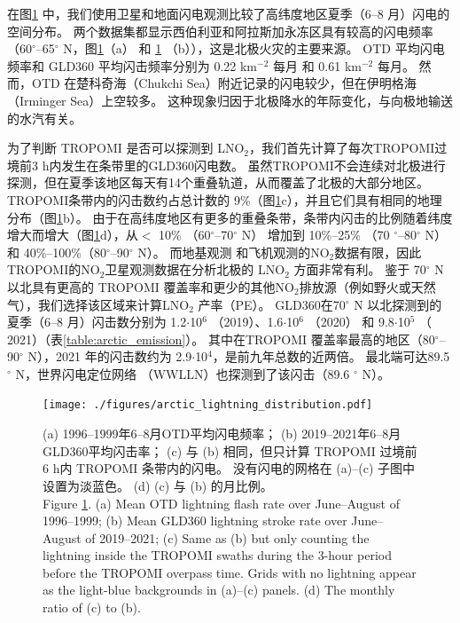 在图\ref{fig:arctic_lightning_distribution} 中，我们使用卫星和地面闪电观测比较了高纬度地区夏季（6--8 月）闪电的空间分布。
两个数据集都显示西伯利亚和阿拉斯加永冻区具有较高的闪电频率（60$^{\circ}$--65$^{\circ}$ N，图\ref{fig:arctic_lightning_distribution}（a） 和 \ref{fig:arctic_lightning_distribution} （b）），这是北极火灾的主要来源\citep{McCarty.2021}。
OTD 平均闪电频率和 GLD360 平均闪击频率分别为 0.22 km$^{-2}$ 每月 和 0.61 km$^{-2}$ 每月。
然而，OTD 在楚科奇海（Chukchi Sea）附近记录的闪电较少，但在伊明格海（Irminger Sea）上空较多。
这种现象归因于北极降水的年际变化，与向极地输送的水汽有关\citep{Bintanja.2020}。

为了判断 TROPOMI 是否可以探测到 LNO$_2$，我们首先计算了每次TROPOMI过境前3 h内发生在条带里的GLD360闪电数。
虽然TROPOMI不会连续对北极进行探测，但在夏季该地区每天有14个重叠轨道，从而覆盖了北极的大部分地区。
TROPOMI条带内的闪击数约占总计数的 9\%（图\ref{fig:arctic_lightning_distribution}c），并且它们具有相同的地理分布（图\ref{fig:arctic_lightning_distribution}b）。
由于在高纬度地区有更多的重叠条带，条带内闪击的比例随着纬度增大而增大（图\ref{fig:arctic_lightning_distribution}d），从$<$ 10\% （60$^{\circ}$--70$^{\circ}$ N） 增加到 10\%--25\% （70 $^{\circ}$--80$^{\circ}$ N） 和 40\%--100\%（80$^{\circ}$--90$^{\circ}$ N）。
而地基观测\citep{Schmale.2018} 和飞机观测\citep{Jacob.2010}的NO$_2$数据有限，因此TROPOMI的NO$_2$卫星观测数据在分析北极的 LNO$_2$ 方面非常有利。
鉴于 70$^{\circ}$ N 以北具有更高的 TROPOMI 覆盖率和更少的其他NO$_2$排放源（例如野火或天然气），我们选择该区域来计算LNO$_2$ 产率（PE）。
GLD360在70$^{\circ}$ N 以北探测到的夏季（6--8 月）闪击数分别为 1.2$\cdot$10$^6$ （2019）、1.6$\cdot$10$^6$ （2020） 和 9.8$\cdot$10$^5$ （ 2021）（表\ref{table:arctic_emission}）。
其中在TROPOMI 覆盖率最高的地区（80$^{\circ}$--90$^{\circ}$ N），2021 年的闪击数约为 2.9$\cdot$10$^4$，是前九年总数的近两倍\citep{networktotal.2021}。
最北端可达89.5$^{\circ}$ N，世界闪电定位网络 （WWLLN）也探测到了该闪击（89.6 $^{\circ}$ N）\citep{Holzworth.2021}。


\begin{figure}[!htbp]
\centering
\texttt{[image: ./figures/arctic\_lightning\_distribution.pdf]}
\caption{
(a) 1996--1999年6--8月OTD平均闪电频率；
(b) 2019--2021年6--8月GLD360平均闪击率；
(c) 与 (b) 相同，但只计算 TROPOMI 过境前 6 h内 TROPOMI 条带内的闪电。
没有闪电的网格在 (a)--(c) 子图中设置为淡蓝色。
(d) (c) 与 (b) 的月比例。\\
Figure \ref{fig:arctic_lightning_distribution}.
(a) Mean OTD lightning flash rate over June--August of 1996--1999;
(b) Mean GLD360 lightning stroke rate over June--August of 2019--2021;
(c) Same as (b) but only counting the lightning inside the TROPOMI swaths during the 3-hour period before the TROPOMI overpass time.
Grids with no lightning appear as the light-blue backgrounds in (a)--(c) panels.
(d) The monthly ratio of (c) to (b).
}
\label{fig:arctic_lightning_distribution}
\end{figure}


